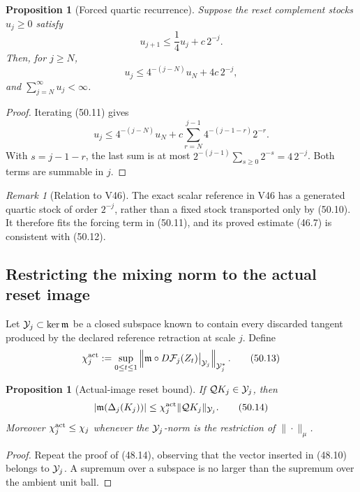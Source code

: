 \documentclass[11pt,oneside]{book}
\newtheorem{proposition}[theorem]{Proposition}
\theoremstyle{definition}
\theoremstyle{remark}
\newtheorem{remark}[theorem]{Remark}
\begin{document}
\begin{proposition}[Forced quartic recurrence]
\label{prop:e8v50-quartic-recurrence}
Suppose the reset complement stocks \(u_j\ge0\) satisfy
\[
 u_{j+1}\le\frac14u_j+c\,2^{-j}.                              \tag{50.11}
\]
Then, for \(j\ge N\),
\[
 u_j\le4^{-(j-N)}u_N+4c\,2^{-j},                             \tag{50.12}
\]
and \(\sum_{j=N}^\infty u_j<\infty\).
\end{proposition}

\begin{proof}
Iterating (50.11) gives
\[
 u_j\le4^{-(j-N)}u_N
 +c\sum_{r=N}^{j-1}4^{-(j-1-r)}2^{-r}.
\]
With \(s=j-1-r\), the last sum is at most
\(2^{-(j-1)}\sum_{s\ge0}2^{-s}=4\,2^{-j}\).
Both terms are summable in \(j\).
\end{proof}

\begin{remark}[Relation to V46]
\label{rem:e8v50-relation-V46}
The exact scalar reference in V46 has a generated quartic stock of
order \(2^{-j}\), rather than a fixed stock transported only by
(50.10).  It therefore fits the forcing term in (50.11), and its
proved estimate (46.7) is consistent with (50.12).
\end{remark}

\subsection{Restricting the mixing norm to the actual reset image}

Let \({\cal Y}_j\subset\ker{\mathfrak m}\) be a closed subspace
known to contain every discarded tangent produced by the declared
reference retraction at scale \(j\).  Define
\[
 \chi_j^{\rm act}
 :=\sup_{0\le t\le1}
 \left\|
 {\mathfrak m}\circ D{\cal F}_j(Z_t)
 \big|_{{\cal Y}_j}
 \right\|_{{\cal Y}_j^*}.                                    \tag{50.13}
\]

\begin{proposition}[Actual-image reset bound]
\label{prop:e8v50-actual-image}
If \({\cal Q}K_j\in{\cal Y}_j\), then
\[
 |{\mathfrak m}(\Delta_j(K_j))|
 \le\chi_j^{\rm act}\|{\cal Q}K_j\|_{{\cal Y}_j}.             \tag{50.14}
\]
Moreover \(\chi_j^{\rm act}\le\chi_j\) whenever the
\({\cal Y}_j\)-norm is the restriction of \(\|\cdot\|_\mu\).
\end{proposition}

\begin{proof}
Repeat the proof of (48.14), observing that the vector inserted in
(48.10) belongs to \({\cal Y}_j\).  A supremum over a subspace is
no larger than the supremum over the ambient unit ball.
\end{proof}
\end{document}
